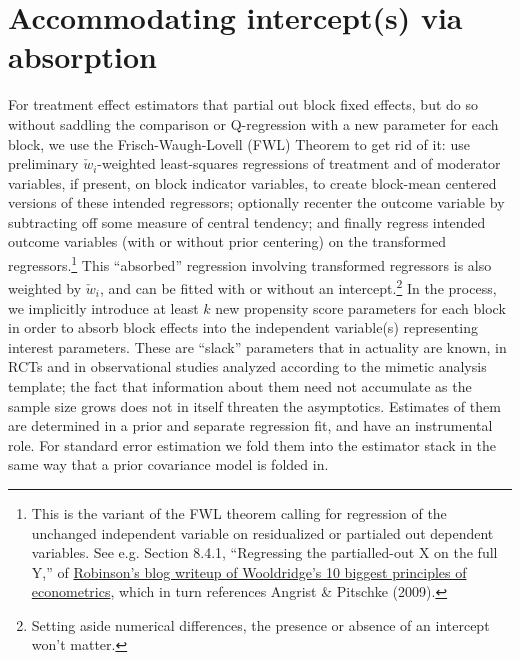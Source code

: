 \documentclass{article}
\newcommand{\owt}[1][{[z_{i}]}]{\ensuremath{\check{w}_{i#1}}}
\begin{document}
\section{Accommodating intercept(s) via absorption}\label{sec:accomm-interc-via}
For treatment effect estimators that partial out block fixed effects,
but do so without saddling the comparison or Q-regression with a new
parameter for each block, we use the
Frisch-Waugh-Lovell (FWL) Theorem to get rid of
it: use preliminary $\owt[]$-weighted least-squares regressions of
treatment and of moderator variables, if present, on block indicator
variables, to create block-mean centered versions of these intended
regressors; optionally recenter the outcome variable by subtracting
off some measure of central tendency; and finally regress intended outcome variables (with or without
prior centering) on the transformed
regressors.\footnote{This is the variant of the FWL theorem calling
  for regression of the unchanged independent variable on residualized
or partialed out dependent variables.  See e.g. Section 8.4.1,
``Regressing the partialled-out X on the full Y,'' of
\href{https://bookdown.org/ts_robinson1994/10_fundamental_theorems_for_econometrics/frisch.html}{Robinson's
  blog writeup of Wooldridge's 10 biggest principles of econometrics},
which in turn references Angrist \& Pitschke (2009).}
This ``absorbed'' regression involving transformed regressors is also weighted by $\owt[]$,
and can be fitted with or without an intercept.\footnote{Setting aside
numerical differences, the presence or absence of an intercept won't
matter.}  
In the process, we implicitly introduce at least $k$ new propensity score parameters
for each block in order to absorb block effects into the
independent variable(s) representing interest parameters.
These are ``slack'' parameters that
in actuality are known, in RCTs and in observational studies analyzed
according to the mimetic analysis template;  the fact that information about them
need not accumulate as the sample size grows does not in itself
threaten the asymptotics. Estimates of them are determined in a prior and separate regression
fit, and have an instrumental role.
For standard error estimation we fold them into the estimator stack in the same way that a prior
covariance model is folded in.
\end{document}
